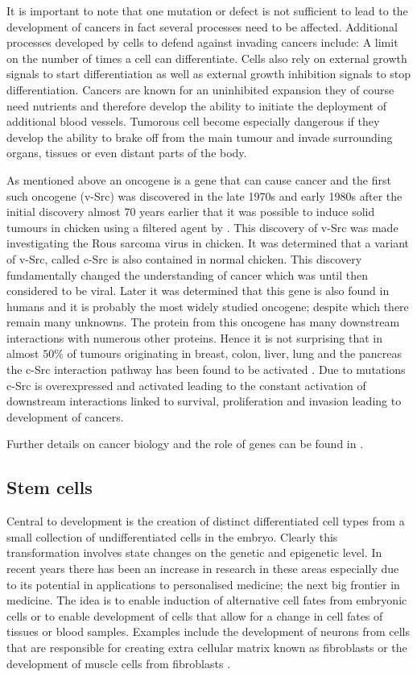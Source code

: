 It is important to note that one mutation or defect is not sufficient to lead to the development of cancers in fact several processes need to be affected. Additional processes developed by cells to defend against invading cancers include: A limit on the number of times a cell can differentiate. Cells also rely on external growth signals to start differentiation as well as external growth inhibition signals to stop differentiation. Cancers are known for an uninhibited expansion they of course need nutrients and therefore develop the ability to initiate the deployment of additional blood vessels. Tumorous cell become especially dangerous if they develop the ability to brake off from the main tumour and invade surrounding organs, tissues or even distant parts of the body.

As mentioned above an oncogene is a gene that can cause cancer and the first such oncogene (v-Src) was discovered in the late 1970s and early 1980s \cite{Martin:2001jx} after the initial discovery almost 70 years earlier that it was possible to induce solid tumours in chicken using a filtered agent by \cite{Rous:1911uf}. This discovery of v-Src was made investigating the Rous sarcoma virus in chicken. It was determined that a variant of v-Src, called c-Src is also contained in normal chicken. This discovery  fundamentally changed the understanding of cancer which was until then considered to be viral. Later it was determined that this gene is also found in humans and it is probably the most widely studied oncogene; despite which there remain many unknowns. The protein from this oncogene has many downstream interactions with numerous other proteins. Hence it is not surprising that in almost $50\%$ of tumours originating in breast, colon, liver, lung and the pancreas the c-Src interaction pathway has been found to be activated \cite{Dehm:2013fr}. Due to mutations c-Src is overexpressed and activated leading to the constant activation of downstream interactions linked to survival, proliferation and invasion leading to development of cancers.

Further details on cancer biology and the role of genes can be found in \cite{Weinberg:2013uu}. 

\subsection{Stem cells}
\label{sec:stem-cells}

Central to development is the creation of distinct differentiated cell types from a small collection of undifferentiated cells in the embryo. Clearly this transformation involves state changes on the genetic and epigenetic level. In recent years there has been an increase in research in these areas especially due to its potential in applications to personalised medicine; the next big frontier in medicine. The idea is to enable induction of alternative cell fates from embryonic cells or to enable development of cells that allow for a change in cell fates of tissues or blood samples. Examples include the development of neurons from cells that are responsible for creating extra cellular matrix known as fibroblasts \citep{Vierbuchen:2010fa, Pang:2011ce} or the development of muscle cells from fibroblasts \citep{Ieda:2010ir, Efe:2011bpa}.

